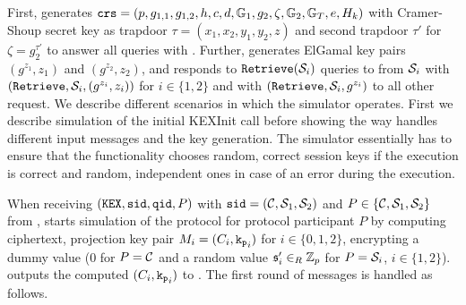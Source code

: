 First, \SIM generates $\mathtt{crs}=(p,g_{1,1},g_{1,2},h,c,d,\mathbb{G}_1,g_{2},\zeta,\mathbb{G}_2,\mathbb{G}_T,e,H_k)$ with Cramer-Shoup secret key as trapdoor $\tau=(x_1,x_2,y_1,y_2,z)$ and second trapdoor $\tau'$ for $\zeta=g_2^{\tau'}$ to answer all \Fcrs queries with \crs.
Further, \SIM generates ElGamal key pairs $(g^{z_1},z_1)$ and $(g^{z_2},z_2)$, and responds to $\mathtt{Retrieve}(\mathcal{S}_i)$ queries to \Fca from $\mathcal{S}_i$ with $(\mathtt{Retrieve}, \mathcal{S}_i, (g^{z_i},z_i))$ for $i\in\{1,2\}$ and with $(\mathtt{Retrieve}, \mathcal{S}_i, g^{z_i})$ to all other request.
We describe different scenarios in which the simulator operates.
First we describe simulation of the initial KEXInit call before showing the way \SIM handles different input messages and the key generation.
The simulator essentially has to ensure that the functionality chooses random, correct session keys if the execution is correct and random, independent ones in case of an error during the execution.

% 
        When receiving $(\mathtt{KEX}, \mathtt{sid}, \mathtt{qid}, P)$ with $\mathtt{sid}=(\mathcal{C}, \mathcal{S}_1, \mathcal{S}_2)$ and $P\in\{\mathcal{C}, \mathcal{S}_1, \mathcal{S}_2\}$ from \FTWOPAKE, \SIM starts simulation of the protocol for protocol participant $P$ by computing ciphertext, projection key pair $M_i=(C_i, \mathtt{k_p}_i)$ for $i\in\{0,1,2\}$, encrypting a dummy value ($0$ for $P=\mathcal{C}$ and a random value $\mathfrak{s}'_i\in_R\mathbb{Z}_p$ for $P=\mathcal{S}_i$, $i\in\{1,2\}$).
        \SIM outputs the computed $(C_i, \mathtt{k_p}_i)$ to \cA.
        The first round of messages is handled as follows.
        
